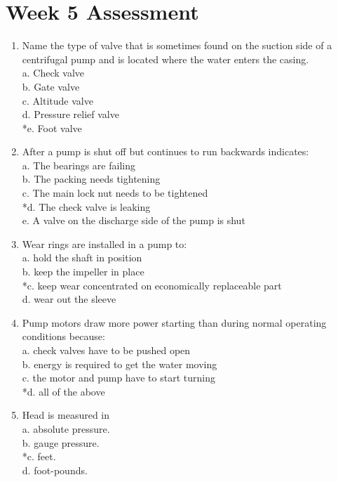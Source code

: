 \section{Week 5 Assessment}
\begin{enumerate}[1.]
\item Name the type of valve that is sometimes found on the suction side of a centrifugal pump and is located where the water enters the casing.\\
a. Check valve\\
b. Gate valve\\
c. Altitude valve\\
d. Pressure relief valve\\
*e. Foot valve\\
\item After a pump is shut off but continues to run backwards indicates:\\
a. The bearings are failing\\
b. The packing needs tightening\\
c. The main lock nut needs to be tightened\\
*d. The check valve is leaking\\
e. A valve on the discharge side of the pump is shut\\
\item Wear rings are installed in a pump to:\\
a. hold the shaft in position\\
b. keep the impeller in place\\
*c. keep wear concentrated on economically replaceable part\\
d. wear out the sleeve\\
\item Pump motors draw more power starting than during normal operating conditions because:\\
a. check valves have to be pushed open\\
b. energy is required to get the water moving\\
c. the motor and pump have to start turning\\
*d. all of the above\\
\item Head is measured in\\
a. absolute pressure.\\
b. gauge pressure.\\
*c. feet.\\
d. foot-pounds.\\

\end{enumerate}
